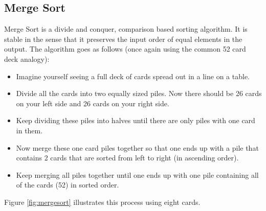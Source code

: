 \subsection{Merge Sort} \label{subsec:merge_sort}
Merge Sort is a divide and conquer, comparison based sorting algorithm. It is stable in the sense that it preserves the input order of equal elements in the output. The algorithm goes as follows (once again using the common 52 card deck analogy):

\begin{itemize}
\item Imagine yourself seeing a full deck of cards spread out in a line on a table.
\item Divide all the cards into two equally sized piles. Now there should be 26 cards on your left side and 26 cards on your right side.
\item Keep dividing these piles into halves until there are only piles with one card in them.
\item Now merge these one card piles together so that one ends up with a pile that contains 2 cards that are sorted from left to right (in ascending order).
\item Keep merging all piles together until one ends up with one pile containing all of the cards (52) in sorted order.

\end{itemize}

Figure \ref{fig:mergesort} illustrates this process using eight cards.

